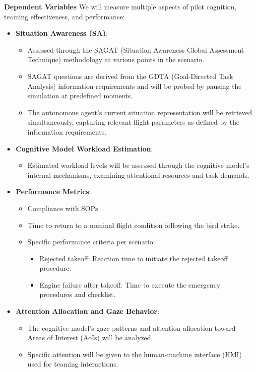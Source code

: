 \documentclass[12pt,a4paper]{article} %
\begin{document}
	\textbf{Dependent Variables}
	We will measure multiple aspects of pilot cognition, teaming effectiveness, and performance:
	\begin{itemize}
	\item \textbf{Situation Awareness (SA)}:
	\begin{itemize}
	\item Assessed through the SAGAT (Situation Awareness Global Assessment Technique) methodology at various points in the scenario.
	\item SAGAT questions are derived from the GDTA (Goal-Directed Task Analysis) information requirements and will be probed by pausing the simulation at predefined moments.
	\item The autonomous agent's current situation representation will be retrieved simultaneously, capturing relevant flight parameters as defined by the information requirements.
	\end{itemize}
	\item \textbf{Cognitive Model Workload Estimation}:
	\begin{itemize}
	\item Estimated workload levels will be assessed through the cognitive model’s internal mechanisms, examining attentional resources and task demands.
	\end{itemize}
	\item \textbf{Performance Metrics}:
	\begin{itemize}
	\item Compliance with SOPs.
	\item Time to return to a nominal flight condition following the bird strike.
	\item Specific performance criteria per scenario:
	\begin{itemize}
	\item Rejected takeoff: Reaction time to initiate the rejected takeoff procedure.
	\item Engine failure after takeoff: Time to execute the emergency procedures and checklist.
	\end{itemize}
	\end{itemize}
	\item \textbf{Attention Allocation and Gaze Behavior}:
	\begin{itemize}
	\item The cognitive model’s gaze patterns and attention allocation toward Areas of Interest (AoIs) will be analyzed.
	\item Specific attention will be given to the human-machine interface (HMI) used for teaming interactions.

\end{itemize}
\end{itemize}
\end{document}
